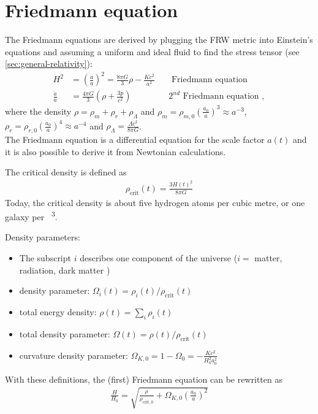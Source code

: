 \section{Friedmann equation}
\label{sec:Friedmann}

The Friedmann equations are derived by plugging the FRW metric into Einstein's equations and assuming a uniform and ideal fluid to find the stress tensor (see \cref{sec:general-relativity}):
\begin{align*}
	H^2 &= \left( \frac{\dot{a}}{a} \right)^2 = \frac{8 \pi G}{3} \rho - \frac{K c^2}{a^2} && \text{ Friedmann equation }\\
	\frac{\ddot{a}}{a} &= \frac{4 \pi G}{3} \left( \rho + \frac{3 p}{c^2} \right) && 2^{nd} \text{ Friedmann equation },
\end{align*}
where the density $\rho = \rho_m + \rho_r + \rho_{\Lambda}$ and $\rho_m = \rho_{m,0} \left( \frac{a_0}{a} \right)^3 \approx a^{-3}$, $\rho_r = \rho_{r,0} \left( \frac{a_0}{a} \right)^4 \approx a^{-4}$ and $\rho_{\Lambda} = \frac{\Lambda c^2}{8 \pi G}$. \\
The Friedmann equation is a differential equation for the scale factor $a(t)$ and it is also possible to derive it from Newtonian calculations. 

The critical density is defined as
\begin{align*}
	\rho_\text{crit}(t) = \frac{3 H(t)^2}{8 \pi G}
\end{align*}
Today, the critical density is about five hydrogen atoms per cubic metre, or one galaxy per \si{\mega\parsec\cubed}.

Density parameters:
\begin{itemize}
	\item The subscript $i$ describes one component of the universe ($i = $ matter, radiation, dark matter \textellipsis)
	\item density parameter: $\Omega_i(t) = \rho_i(t)/\rho_\text{crit}(t)$
	\item total energy density: $\rho(t) = \sum_{i} \rho_i(t)$
	\item total density parameter: $\Omega(t) = \rho(t)/\rho_\text{crit}(t)$
	\item curvature density parameter: $\Omega_{K,0} = 1 - \Omega_0 = - \frac{Kc^2}{H_0^2 a_0^2}$
\end{itemize}

With these definitions, the (first) Friedmann equation can be rewritten as
\begin{align*}
	\frac{H}{H_0} = \sqrt{\frac{\rho}{\rho_{\text{crit}, 0}} + \Omega_{K,0} \left( \frac{a_0}{a} \right)^2 }
\end{align*}




